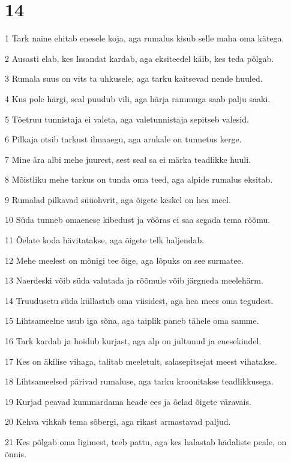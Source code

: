 \chapter{14}

\par 1 Tark naine ehitab enesele koja, aga rumalus kisub selle maha oma kätega.
\par 2 Ausasti elab, kes Issandat kardab, aga eksiteedel käib, kes teda põlgab.
\par 3 Rumala suus on vits ta uhkusele, aga tarku kaitsevad nende huuled.
\par 4 Kus pole härgi, seal puudub vili, aga härja rammuga saab palju saaki.
\par 5 Tõetruu tunnistaja ei valeta, aga valetunnistaja sepitseb valesid.
\par 6 Pilkaja otsib tarkust ilmaaegu, aga arukale on tunnetus kerge.
\par 7 Mine ära albi mehe juurest, sest seal sa ei märka teadlikke huuli.
\par 8 Mõistliku mehe tarkus on tunda oma teed, aga alpide rumalus eksitab.
\par 9 Rumalad pilkavad süüohvrit, aga õigete keskel on hea meel.
\par 10 Süda tunneb omaenese kibedust ja võõras ei saa segada tema rõõmu.
\par 11 Õelate koda hävitatakse, aga õigete telk haljendab.
\par 12 Mehe meelest on mõnigi tee õige, aga lõpuks on see surmatee.
\par 13 Naerdeski võib süda valutada ja rõõmule võib järgneda meelehärm.
\par 14 Truudusetu süda küllastub oma viisidest, aga hea mees oma tegudest.
\par 15 Lihtsameelne usub iga sõna, aga taiplik paneb tähele oma samme.
\par 16 Tark kardab ja hoidub kurjast, aga alp on jultunud ja enesekindel.
\par 17 Kes on äkilise vihaga, talitab meeletult, salasepitsejat meest vihatakse.
\par 18 Lihtsameelsed pärivad rumaluse, aga tarku kroonitakse teadlikkusega.
\par 19 Kurjad peavad kummardama heade ees ja õelad õigete väravais.
\par 20 Kehva vihkab tema sõbergi, aga rikast armastavad paljud.
\par 21 Kes põlgab oma ligimest, teeb pattu, aga kes halastab hädaliste peale, on õnnis.
